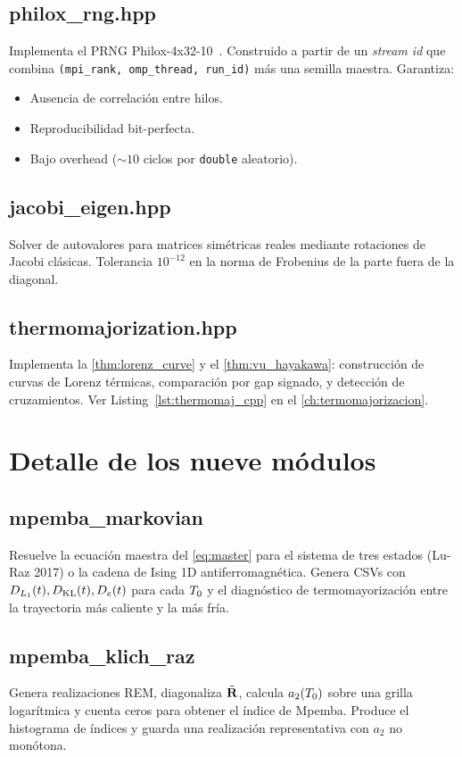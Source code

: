 \subsection{philox\_rng.hpp}

Implementa el PRNG Philox-4x32-10~\cite{salmon2011}. Construido a partir de un 
\emph{stream id} que combina \texttt{(mpi\_rank, omp\_thread, run\_id)} más 
una semilla maestra. Garantiza:
\begin{itemize}
\item Ausencia de correlación entre hilos.
\item Reproducibilidad bit-perfecta.
\item Bajo overhead ($\sim 10$ ciclos por \texttt{double} aleatorio).
\end{itemize}

\subsection{jacobi\_eigen.hpp}

Solver de autovalores para matrices simétricas reales mediante rotaciones de 
Jacobi clásicas. Tolerancia $10^{-12}$ en la norma de Frobenius de la parte 
fuera de la diagonal.

\subsection{thermomajorization.hpp}

Implementa la \cref{thm:lorenz_curve} y el \cref{thm:vu_hayakawa}: 
construcción de curvas de Lorenz térmicas, comparación por gap signado, y 
detección de cruzamientos. Ver Listing~\ref{lst:thermomaj_cpp} en el 
\cref{ch:termomajorizacion}.

\section{Detalle de los nueve módulos}

\subsection{mpemba\_markovian}
Resuelve la ecuación maestra del \cref{eq:master} para el sistema de tres 
estados (Lu-Raz 2017) o la cadena de Ising 1D antiferromagnética. Genera CSVs 
con $D_{L_{1}}(t), D_{\mathrm{KL}}(t), D_{e}(t)$ para cada $T_{0}$ y el diagnóstico de 
termomayorización entre la trayectoria más caliente y la más fría.

\subsection{mpemba\_klich\_raz}
Genera realizaciones REM, diagonaliza $\tilde{\vb{R}}$, calcula 
$a_2(T_{0})$ sobre una grilla logarítmica y cuenta ceros para obtener el 
índice de Mpemba. Produce el histograma de índices y guarda una realización 
representativa con $a_2$ no monótona.

